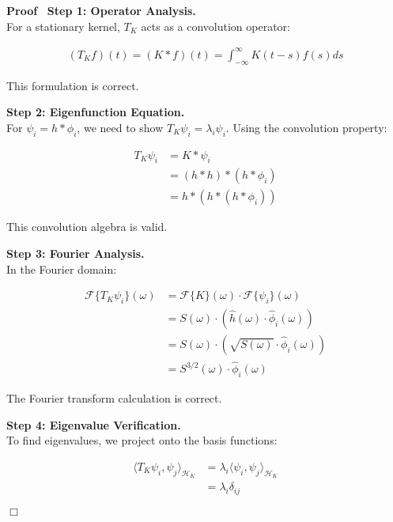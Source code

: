 \documentclass{article}
\newcommand{\tmcolor}[2]{{\color{#1}{#2}}}
\newenvironment{proof}{\noindent\textbf{Proof\ }}{\hspace*{\fill}$\Box$\medskip}
\begin{document}
\begin{proof}
  \textbf{Step 1: Operator Analysis.}\\
  For a stationary kernel, $T_K$ acts as a convolution operator:
  
  \begin{align}
    (T_K f) (t) = (K \ast f) (t) = \int_{- \infty}^{\infty} K (t - s) f (s) ds
    
  \end{align}
  
  \tmcolor{green}{{\checkmark}} This formulation is correct.
  
  \textbf{Step 2: Eigenfunction Equation.}\\
  For $\psi_i = h \ast \phi_i$, we need to show $T_K \psi_i = \lambda_i
  \psi_i$. Using the convolution property:
  
  \begin{align}
    T_K \psi_i & = K \ast \psi_i \\
    & = (h \ast h) \ast (h \ast \phi_i) \\
    & = h \ast (h \ast (h \ast \phi_i)) 
  \end{align}
  
  \tmcolor{green}{{\checkmark}} This convolution algebra is valid.
  
  \textbf{Step 3: Fourier Analysis.}\\
  In the Fourier domain:
  
  \begin{align}
    \mathcal{F} \{T_K \psi_i \} (\omega) & =\mathcal{F} \{K\} (\omega) \cdot
    \mathcal{F} \{\psi_i \} (\omega) \\
    & = S (\omega) \cdot (\hat{h} (\omega) \cdot \hat{\phi}_i (\omega)) \\
    & = S (\omega) \cdot (\sqrt{S (\omega)} \cdot \hat{\phi}_i (\omega)) \\
    & = S^{3 / 2} (\omega) \cdot \hat{\phi}_i (\omega) 
  \end{align}
  
  \tmcolor{green}{{\checkmark}} The Fourier transform calculation is correct.
  
  \textbf{Step 4: Eigenvalue Verification.}\\
  To find eigenvalues, we project onto the basis functions:
  
  \begin{align}
    \langle T_K \psi_i, \psi_j \rangle_{\mathcal{H}_K} & = \lambda_i  \langle
    \psi_i, \psi_j \rangle_{\mathcal{H}_K} \\
    & = \lambda_i \delta_{ij} 
  \end{align}
  

\end{proof}
\end{document}
